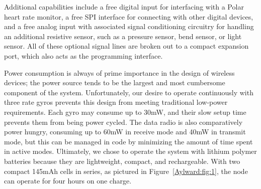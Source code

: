 Additional capabilities include a free digital input for interfacing with a
Polar heart rate monitor, a free SPI interface for connecting with other digital
devices, and a free analog input with associated signal conditioning circuitry
for handling an additional resistive sensor, such as a pressure sensor, bend
sensor, or light sensor. All of these optional signal lines are broken out to a
compact expansion port, which also acts as the programming interface.

Power consumption is always of prime importance in the design of wireless
devices; the power source tends to be the largest and most cumbersome component
of the system. Unfortunately, our desire to operate continuously with three rate
gyros prevents this design from meeting traditional low-power requirements. Each
gyro may consume up to 30mW, and their slow setup time prevents them from being
power cycled. The data radio is also comparatively power hungry, consuming up to
60mW in receive mode and 40mW in transmit mode, but this can be managed in code
by minimizing the amount of time spent in active modes. Ultimately, we chose to
operate the system with lithium polymer batteries because they are lightweight,
compact, and rechargeable. With two compact 145mAh cells in series, as pictured
in Figure~\ref{Aylward:fig:1}, the node can operate for four hours on one charge.

